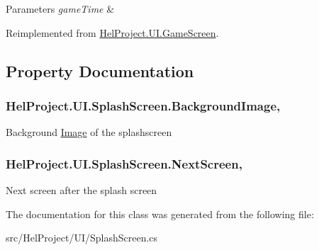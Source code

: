 \begin{DoxyParams}{Parameters}
{\em game\+Time} & \\
\hline
\end{DoxyParams}


Reimplemented from \hyperlink{class_hel_project_1_1_u_i_1_1_game_screen_a4aefe31814b0081be3ba4f1243b8cee6}{Hel\+Project.\+U\+I.\+Game\+Screen}.



\subsection{Property Documentation}
\hypertarget{class_hel_project_1_1_u_i_1_1_splash_screen_adb2597647fe28bc0a62aec62c5a4e435}{}
\subsubsection[{Background\+Image}]{ Hel\+Project.\+U\+I.\+Splash\+Screen.\+Background\+Image\hspace{0.3cm}{\ttfamily [get]}, {\ttfamily [set]}}\label{class_hel_project_1_1_u_i_1_1_splash_screen_adb2597647fe28bc0a62aec62c5a4e435}


Background \hyperlink{class_hel_project_1_1_u_i_1_1_image}{Image} of the splashscreen 

\hypertarget{class_hel_project_1_1_u_i_1_1_splash_screen_abcc41435703b36b419b18600a05a42f5}{}
\subsubsection[{Next\+Screen}]{ Hel\+Project.\+U\+I.\+Splash\+Screen.\+Next\+Screen\hspace{0.3cm}{\ttfamily [get]}, {\ttfamily [set]}}\label{class_hel_project_1_1_u_i_1_1_splash_screen_abcc41435703b36b419b18600a05a42f5}


Next screen after the splash screen 



The documentation for this class was generated from the following file\+:\begin{DoxyCompactItemize}
\item 
src/\+Hel\+Project/\+U\+I/Splash\+Screen.\+cs\end{DoxyCompactItemize}
